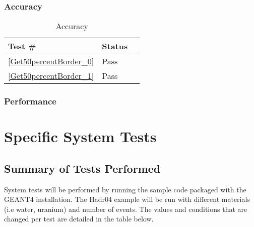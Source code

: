 \documentclass[12pt]{article}
\begin{document}
	\subsubsection{Accuracy}
		\begin{table}[H]
		\centering
		\caption{Accuracy}\label{Get50percentBorder_acc}
		\begin{tabular}{lll}
		\toprule
		\bf Test \# & Status \\\midrule		
		\ref{Get50percentBorder_0} & Pass\\
		\ref{Get50percentBorder_1} & Pass\\
		\bottomrule
		\end{tabular}
		\end{table}
	\subsubsection{Performance}

\section{Specific System Tests}
\subsection{Summary of Tests Performed}
System tests will be performed by running the sample code packaged with the GEANT4 installation. The Hadr04 example will be run with different materials (i.e water, uranium) and number of events. The values and conditions that are changed per test are detailed in the table below.\\ \\
\end{document}
